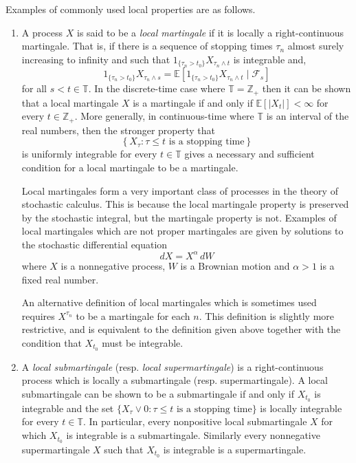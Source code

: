 \documentclass[12pt]{article}
\begin{document}
Examples of commonly used local properties are as follows.
\begin{enumerate}
\item A process $X$ is said to be a \emph{local martingale} if it is locally a right-continuous martingale. That is, if there is a sequence of stopping times $\tau_n$ almost surely increasing to infinity and such that $1_{\{\tau_n>t_0\}}X_{\tau_n\wedge t}$ is integrable and,
\begin{equation*}
1_{\{\tau_n>t_0\}}X_{\tau_n\wedge s}=\mathbb{E}[1_{\{\tau_n>t_0\}}X_{\tau_n\wedge t}\mid\mathcal{F}_s]
\end{equation*}
for all $s<t\in\mathbb{T}$.
In the discrete-time case where $\mathbb{T}=\mathbb{Z}_+$ then it can be shown that a local martingale $X$ is a martingale if and only if $\mathbb{E}[|X_t|]<\infty$ for every $t\in\mathbb{Z}_+$.
More generally, in continuous-time where $\mathbb{T}$ is an interval of the real numbers, then the stronger property that
\begin{equation*}
\left\{X_{\tau}:\tau\le t\textrm{ is a stopping time}\right\}
\end{equation*}
is uniformly integrable for every $t\in\mathbb{T}$ gives a necessary and sufficient condition for a local martingale to be a martingale.

Local martingales form a very important class of processes in the theory of stochastic calculus. This is because the local martingale property is preserved by the stochastic integral, but the martingale property is not.
Examples of local martingales which are not proper martingales are given by solutions to the stochastic differential equation
\begin{equation*}
dX = X^{\alpha}\,dW
\end{equation*}
where $X$ is a nonnegative process, $W$ is a Brownian motion and $\alpha>1$ is a fixed real number.

An alternative definition of local martingales which is sometimes used requires $X^{\tau_n}$ to be a martingale for each $n$. This definition is slightly more restrictive, and is equivalent to the definition given above together with the condition that $X_{t_0}$ must be integrable.

\item A \emph{local submartingale} (resp. \emph{local supermartingale}) is a right-continuous process which is locally a submartingale (resp. supermartingale). A local submartingale can be shown to be a submartingale if and only if $X_{t_0}$ is integrable and the set $\{X_\tau\vee 0:\tau\le t\textrm{ is a stopping time}\}$ is locally integrable for every $t\in\mathbb{T}$. In particular, every nonpositive local submartingale $X$ for which $X_{t_0}$ is integrable is a submartingale. Similarly every nonnegative supermartingale $X$ such that $X_{t_0}$ is integrable is a supermartingale.


\end{enumerate}
\end{document}
